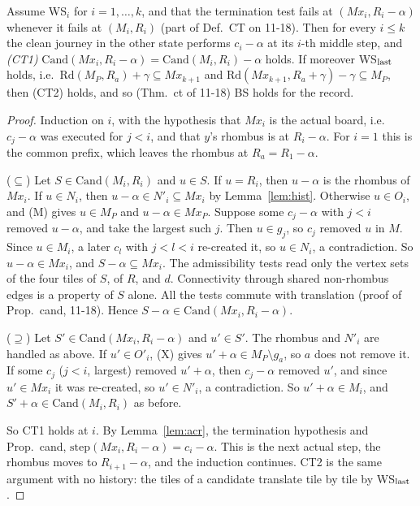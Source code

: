 \begin{theorem}[CT1 from WS]\label{thm:red}
Assume WS$_i$ for $i=1,\dots,k$, and that the termination test fails at $(Mx_i,R_i-\alpha)$ whenever it fails at $(M_i,R_i)$ (part of Def.~CT on 11-18). Then for every $i\le k$ the clean journey in the other state performs $c_i-\alpha$ at its $i$-th middle step, and \emph{(CT1)} $\mathrm{Cand}(Mx_i,R_i-\alpha)=\mathrm{Cand}(M_i,R_i)-\alpha$ holds.
If moreover WS$_{\rm last}$ holds, i.e.\ $\mathrm{Rd}(M_P,R_a)+\gamma\subseteq Mx_{k+1}$ and $\mathrm{Rd}(Mx_{k+1},R_a+\gamma)-\gamma\subseteq M_P$, then (CT2) holds, and so (Thm.~ct of 11-18) BS holds for the record.
\end{theorem}
\begin{proof}
Induction on $i$, with the hypothesis that $Mx_i$ is the actual board, i.e.\ $c_j-\alpha$ was executed for $j<i$, and that $y$'s rhombus is at $R_i-\alpha$. For $i=1$ this is the common prefix, which leaves the rhombus at $R_a=R_1-\alpha$.

($\subseteq$) Let $S\in\mathrm{Cand}(M_i,R_i)$ and $u\in S$. If $u=R_i$, then $u-\alpha$ is the rhombus of $Mx_i$. If $u\in N_i$, then $u-\alpha\in N'_i\subseteq Mx_i$ by Lemma~\ref{lem:hist}.
Otherwise $u\in O_i$, and (M) gives $u\in M_P$ and $u-\alpha\in Mx_P$. Suppose some $c_j-\alpha$ with $j<i$ removed $u-\alpha$, and take the largest such $j$. Then $u\in g_j$, so $c_j$ removed $u$ in $M$. Since $u\in M_i$, a later $c_l$ with $j<l<i$ re-created it, so $u\in N_i$, a contradiction. So $u-\alpha\in Mx_i$, and $S-\alpha\subseteq Mx_i$.
The admissibility tests read only the vertex sets of the four tiles of $S$, of $R$, and $d$. Connectivity through shared non-rhombus edges is a property of $S$ alone. All the tests commute with translation (proof of Prop.~cand, 11-18). Hence $S-\alpha\in\mathrm{Cand}(Mx_i,R_i-\alpha)$.

($\supseteq$) Let $S'\in\mathrm{Cand}(Mx_i,R_i-\alpha)$ and $u'\in S'$. The rhombus and $N'_i$ are handled as above. If $u'\in O'_i$, (X) gives $u'+\alpha\in M_P\setminus g_a$, so $a$ does not remove it.
If some $c_j$ ($j<i$, largest) removed $u'+\alpha$, then $c_j-\alpha$ removed $u'$, and since $u'\in Mx_i$ it was re-created, so $u'\in N'_i$, a contradiction. So $u'+\alpha\in M_i$, and $S'+\alpha\in\mathrm{Cand}(M_i,R_i)$ as before.

So CT1 holds at $i$. By Lemma~\ref{lem:acr}, the termination hypothesis and Prop.~cand, $\mathrm{step}(Mx_i,R_i-\alpha)=c_i-\alpha$. This is the next actual step, the rhombus moves to $R_{i+1}-\alpha$, and the induction continues.
CT2 is the same argument with no history: the tiles of a candidate translate tile by tile by WS$_{\rm last}$.
\end{proof}

